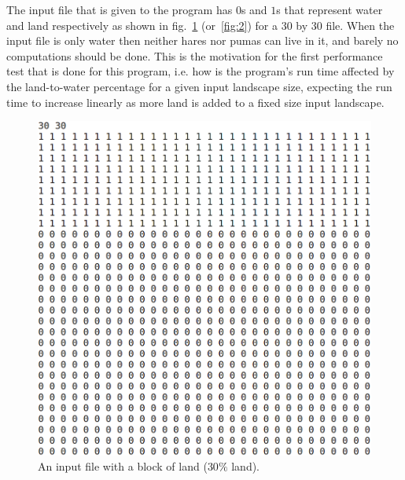 \documentclass[12pt,a4paper]{article}
\begin{document}
The input file that is given to the program has $0$s and $1$s that represent 
water and land respectively as shown in fig.~\ref{fig:1} (or~\ref{fig:2}) for a 
$30$ by $30$ 
file. When the input file is only water then neither hares nor pumas can live in 
it, and barely no computations should be done. This is the motivation for the 
first performance test that is done for this program, i.e. how is the 
program's run time affected by the land-to-water percentage for a given input 
landscape size, expecting the run time to increase linearly as more land is 
added to a fixed size input landscape.

\begin{figure}[ht]
\begin{minipage}[b]{0.475\linewidth}
\centering
\includegraphics[width=\textwidth]{img/input_file.png}
\caption{An input file with a block of land ($30\%$ land).}
\label{fig:1}
\end{minipage}
\hspace{0.5cm}
\begin{minipage}[b]{0.475\linewidth}
\centering

\end{minipage}
\end{figure}
\end{document}

